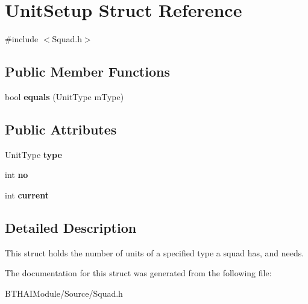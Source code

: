 \hypertarget{struct_unit_setup}{
\section{UnitSetup Struct Reference}
\label{struct_unit_setup}
}


{\ttfamily \#include $<$Squad.h$>$}

\subsection*{Public Member Functions}
\begin{DoxyCompactItemize}
\item 
\hypertarget{struct_unit_setup_abf6d1d46a221ed56e5b2274bca316403}{
bool {\bfseries equals} (UnitType mType)}
\label{struct_unit_setup_abf6d1d46a221ed56e5b2274bca316403}

\end{DoxyCompactItemize}
\subsection*{Public Attributes}
\begin{DoxyCompactItemize}
\item 
\hypertarget{struct_unit_setup_a6665631fe1080c31e51ac58bd17a9741}{
UnitType {\bfseries type}}
\label{struct_unit_setup_a6665631fe1080c31e51ac58bd17a9741}

\item 
\hypertarget{struct_unit_setup_aed8c7114cbebda909c5ecaed720075a4}{
int {\bfseries no}}
\label{struct_unit_setup_aed8c7114cbebda909c5ecaed720075a4}

\item 
\hypertarget{struct_unit_setup_a4a820e914895b448ad20912421d99ee7}{
int {\bfseries current}}
\label{struct_unit_setup_a4a820e914895b448ad20912421d99ee7}

\end{DoxyCompactItemize}


\subsection{Detailed Description}
This struct holds the number of units of a specified type a squad has, and needs. 

The documentation for this struct was generated from the following file:\begin{DoxyCompactItemize}
\item 
BTHAIModule/Source/Squad.h\end{DoxyCompactItemize}
